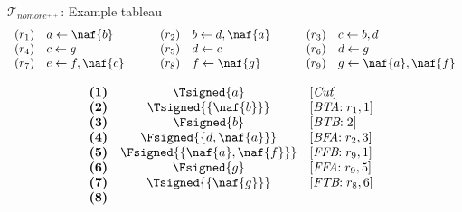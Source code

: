\begin{frame}{$\mathcal{T}_{\textit{nomore}^{++}}$: Example tableau}
\small
\[
\begin{array}{llllllllllll}
(r_1)  &  a \leftarrow \naf{b}                  & & &
(r_2)  &  b \leftarrow d, \naf{a}               & & &
(r_3)  &  c \leftarrow b, d                            \\
(r_4)  &  c \leftarrow g                               & & &
(r_5)  &  d \leftarrow c                               & & &
(r_6)  &  d \leftarrow g                               \\
(r_7)  &  e \leftarrow f, \naf{c}               & & &
(r_8)  &  f \leftarrow \naf{g}                  & & &
(r_9)  &  g \leftarrow \naf{a}, \naf{f}
\end{array}
\]
\begin{center}
\hspace*{-15pt}
\begin{minipage}[t]{16cm}
\tiny
\begin{minipage}[t]{4.5cm}
\[
\hspace{-0.2cm}
\begin{array}{lcl}
\textbf{(1)}                                       &
  \Tsigned{a}                                      &
  [\textit{Cut}]                                   \\
\textbf{(2)}                                       &
  \Tsigned{\{\naf{b}\}}                     &
  [\textit{BTA}{:}\; r_1, \text{1}]                \\
\textbf{(3)}                                       &
  \Fsigned{b}                                      &
  [\textit{BTB}{:}\; \text{2}]                     \\
\textbf{(4)}                                       &
  \Fsigned{\{d,\naf{a}\}}                   &
  [\textit{BFA}{:}\;r_2, \text{3}]                 \\
\textbf{(5)}                                       &
  \Fsigned{\{\naf{a},\naf{f}\}}      &
  [\textit{FFB}{:}\;r_9, \text{1}]                 \\
\textbf{(6)}                                       &
  \Fsigned{g}                                      &
  [\textit{FFA}{:}\;r_9, \text{5}]                 \\
\textbf{(7)}                                       &
  \Tsigned{\{\naf{g}\}}                     &
  [\textit{FTB}{:}\;r_8, \text{6}]                 \\
\textbf{(8)}                                       &

\end{array}\]
\end{minipage}
\end{minipage}
\end{center}
\end{frame}
